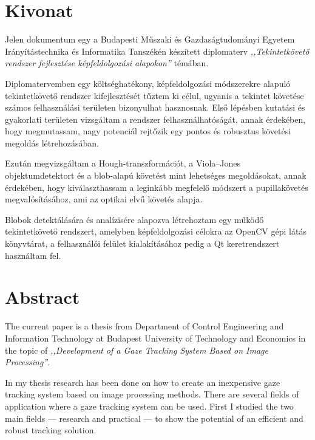 \chapter*{Kivonat}

Jelen dokumentum egy a Budapesti Műszaki és Gazdaságtudományi Egyetem Irányítástechnika és Informatika Tanszékén készített diplomaterv \emph{,,Tekintetkövető rendszer fejlesztése képfeldolgozási alapokon''} témában. 

\bigskip

Diplomatervemben egy költséghatékony, képfeldolgozási módszerekre alapuló tekintetkövető rendszer kifejlesztését tűztem ki célul, ugyanis a tekintet követése számos felhasználási területen bizonyulhat hasznosnak. Első lépésben kutatási és gyakorlati területen vizsgáltam a rendszer felhasználhatóságát, annak érdekében, hogy megmutassam, nagy potenciál rejtőzik egy pontos és robusztus követési megoldás létrehozásában.

Ezután megvizsgáltam a Hough-transzformációt, a Viola--Jones objektumdetektort és a blob-alapú követést mint lehetséges megoldásokat, annak érdekében, hogy kiválaszthassam a leginkább megfelelő módszert a pupillakövetés megvalósításához, ami az optikai elvű követés alapja.

Blobok detektálására és analízisére alapozva létrehoztam egy működő tekintetkövető rendszert, amelyben képfeldolgozási célokra az OpenCV gépi látás könyvtárat, a felhasználói felület kialakításához pedig a Qt keretrendszert használtam fel.


\newpage

\chapter*{Abstract}

The current paper is a thesis from Department of Control Engineering and Information Technology at Budapest University of Technology and Economics in the topic of \emph{,,Development of a Gaze Tracking System Based on Image Processing''}. 

\bigskip

In my thesis research has been done on how to create an inexpensive gaze tracking system based on image processing methods. There are several fields of application where a gaze tracking system can be used. First I studied the two main fields --- research and practical --- to show the potential of an efficient and robust tracking solution.

